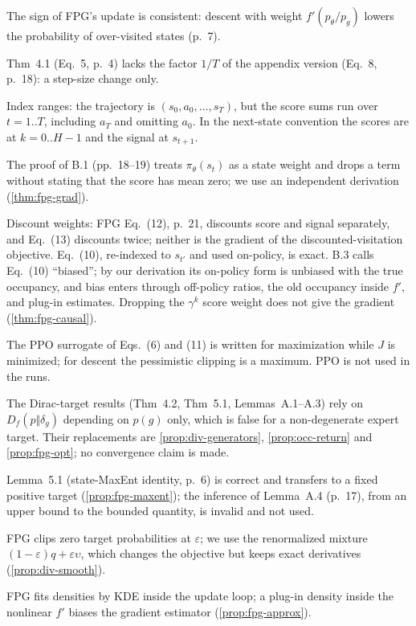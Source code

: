\begin{description}[style=nextline,leftmargin=1.2cm,font=\normalfont\sffamily]
\item[F1] The sign of FPG's update is consistent: descent with weight $f'(p_\theta/p_g)$ lowers the probability of over-visited states (p.~7).
\item[F2] Thm~4.1 (Eq.~5, p.~4) lacks the factor $1/T$ of the appendix version (Eq.~8, p.~18): a step-size change only.
\item[F3] Index ranges: the trajectory is $(s_0,a_0,\dots,s_T)$, but the score sums run over $t=1..T$, including $a_T$ and omitting $a_0$. In the next-state convention the scores are at $k=0..H-1$ and the signal at $s_{t+1}$.
\item[F4] The proof of B.1 (pp.~18--19) treats $\pi_\theta(s_t)$ as a state weight and drops a term without stating that the score has mean zero; we use an independent derivation (\cref{thm:fpg-grad}).
\item[F5] Discount weights: FPG Eq.~(12), p.~21, discounts score and signal separately, and Eq.~(13) discounts twice; neither is the gradient of the discounted-visitation objective. Eq.~(10), re-indexed to $s_{t'}$ and used on-policy, is exact. B.3 calls Eq.~(10) ``biased''; by our derivation its on-policy form is unbiased with the true occupancy, and bias enters through off-policy ratios, the old occupancy inside $f'$, and plug-in estimates. Dropping the $\gamma^k$ score weight does not give the gradient (\cref{thm:fpg-causal}).
\item[F6] The PPO surrogate of Eqs.~(6) and (11) is written for maximization while $J$ is minimized; for descent the pessimistic clipping is a maximum. PPO is not used in the runs.
\item[F7] The Dirac-target results (Thm~4.2, Thm~5.1, Lemmas~A.1--A.3) rely on $D_f(p\Vert\delta_g)$ depending on $p(g)$ only, which is false for a non-degenerate expert target. Their replacements are \cref{prop:div-generators}, \cref{prop:occ-return} and \cref{prop:fpg-opt}; no convergence claim is made.
\item[F8] Lemma~5.1 (state-MaxEnt identity, p.~6) is correct and transfers to a fixed positive target (\cref{prop:fpg-maxent}); the inference of Lemma~A.4 (p.~17), from an upper bound to the bounded quantity, is invalid and not used.
\item[F9] FPG clips zero target probabilities at $\varepsilon$; we use the renormalized mixture $(1-\varepsilon)q+\varepsilon\upsilon$, which changes the objective but keeps exact derivatives (\cref{prop:div-smooth}).
\item[F10] FPG fits densities by KDE inside the update loop; a plug-in density inside the nonlinear $f'$ biases the gradient estimator (\cref{prop:fpg-approx}).
\end{description}


